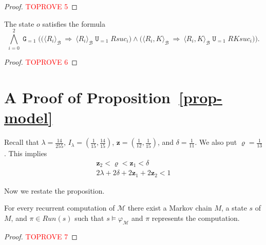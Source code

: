 \documentclass[a4paper,UKenglish,cleveref, autoref, thm-restate]{lipics-v2021}
\newcommand{\B}{\mathcal{B}}
\newcommand{\M}{\mathcal{M}}
\newcommand{\run}{\textit{Run}}
\newcommand{\ex}[1]{\langle #1 \rangle}
\renewcommand{\vec}[1]{\pmb{#1}}
\newcommand{\RSuc}{\textit{Rsuc}}
\newcommand{\RKSuc}{\textit{RKsuc}}
\newcommand*{\opu}{\operatorname{\pmb{\mathtt{U}}}}
\newcommand*{\opg}{\operatorname{\pmb{\mathtt{G}}}}
\begin{document}
\begin{proof}\textcolor{red}{TOPROVE 5}\end{proof}



\begin{proposition}
The state $o$ satisfies the formula
\[
       \bigwedge_{i=0}^2 \opg_{=1} \bigg(
       \big( \ex{R_i}_{\B} \ \Rightarrow \ \ex{R_i}_{\B} \opu_{=1} \RSuc_i \big) 
       \wedge
       \big( \ex{R_i,K}_{\B} \ \Rightarrow \ \ex{R_i,K}_{\B} \opu_{=1} \RKSuc_i \big) 
       \bigg).
\]
\end{proposition}

\begin{proof}\textcolor{red}{TOPROVE 6}\end{proof}





\section{A Proof of Proposition~\ref{prop-model}}
\label{app-two-counter-extension}

Recall that $\lambda = \frac{14}{255}$, $I_\lambda =(\frac{1}{15},\frac{14}{15})$, $\vec{z} = (\frac{1}{12},\frac{1}{15})$, and $\delta = \frac{1}{11}$.  
We also put $\varrho = \frac{1}{13}$. This implies
\begin{eqnarray}
\vec{z}_2 < \varrho < \vec{z}_1 <\delta \label{in-cons-one}\\
2\lambda + 2\delta + 2\vec{z}_1 + 2\vec{z}_2 < 1 \label{in-cons-two}
\end{eqnarray}

\noindent
Now we restate the proposition.
\newtheorem{innercustomprop}{Proposition}
\newenvironment{customprop}[1]
  {\renewcommand\theinnercustomprop{#1}\innercustomprop}
  {\endinnercustomprop}


\begin{customprop}{\ref{prop-model}}
    For every recurrent computation of $\M$ there exist a Markov chain $M$, a state $s$ of $M$, and $\pi \in \run(s)$ such that $s \models \varphi_\M$ and $\pi$ represents the computation.
\end{customprop}
\begin{proof}\textcolor{red}{TOPROVE 7}\end{proof}
\end{document}
